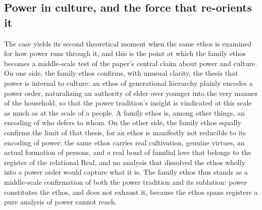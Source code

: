 \subsection*{Power in culture, and the force that re-orients it}

The case yields its second theoretical moment when the same ethos is examined for how power runs through it, and this is the point at which the family ethos becomes a middle-scale test of the paper's central claim about power and culture. On one side, the family ethos confirms, with unusual clarity, the thesis that power is internal to culture: an ethos of generational hierarchy plainly encodes a power order, naturalizing an authority of elder over younger into the very manner of the household, so that the power tradition's insight is vindicated at this scale as much as at the scale of a people. A family ethos is, among other things, an encoding of who defers to whom. On the other side, the family ethos equally confirms the limit of that thesis, for an ethos is manifestly not reducible to its encoding of power: the same ethos carries real cultivation, genuine virtues, an actual formation of persons, and a real bond of familial love that belongs to the register of the relational Real, and no analysis that dissolved the ethos wholly into a power order would capture what it is. The family ethos thus stands as a middle-scale confirmation of both the power tradition and its sublation: power constitutes the ethos, and does not exhaust it, because the ethos spans registers a pure analysis of power cannot reach.

